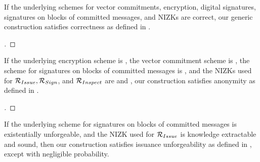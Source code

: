 \begin{theorem}
  \label{thm:correctness-uas}
  If the underlying schemes for vector commitments, encryption, digital
  signatures, signatures on blocks of committed messages, and NIZKs are
  correct, our generic construction \CUASGen satisfies correctness as
  defined in .
\end{theorem}

\begin{proof}[]
\end{proof}

\begin{theorem}
  \label{thm:anonymity-uas}
  If the underlying encryption scheme is , the vector commitment
  scheme is , the scheme for signatures on blocks of committed
  messages is , and the NIZKs used for $\mathcal{R}_{Issue},
  \mathcal{R}_{Sign}$, and $\mathcal{R}_{Inspect}$ are  and
  , our \CUASGen construction satisfies anonymity as
  defined in .
\end{theorem}

\begin{proof}[]
\end{proof}

\begin{theorem}
  \label{thm:issue-forge-uas}
  If the underlying scheme for signatures on blocks of committed messages is
  existentially unforgeable, and the NIZK used for $\mathcal{R}_{Issue}$ is
  knowledge extractable and sound, then our \CUASGen construction satisfies
  issuance unforgeability as defined in , except
  with negligible probability. 
\end{theorem}


